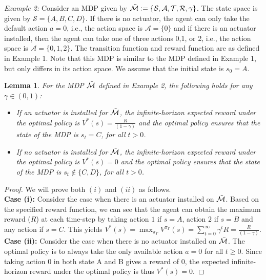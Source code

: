 \documentclass[twocolumn]{autart}    %
\newtheorem{lemma}{Lemma}
\begin{document}
\textit{Example 2:} Consider an MDP given by $\Tilde{\mathcal{M}}:= \{\mathcal{S},\mathcal{A},  \mathcal{T}, \mathcal{R}, \gamma \}$. The state space is given by $\mathcal{S} = \{ A, B, C, D\}$. If there is no actuator, the agent can only take the default action $a = 0$, i.e., the action space is $\mathcal{A} = \{ 0\}$ and if there is an actuator installed, then the agent can take one of three actions 0,1, or 2,  i.e., the action space is $\mathcal{A} = \{ 0,1,2\}$. The transition function and reward function are as defined in Example 1. Note that this MDP is similar to the MDP defined in Example 1, but only differs in its action space. We assume that the initial state is $s_0 = A$.\\

\begin{lemma}
 \label{lma2}
For the MDP $\Tilde{\mathcal{M}}$ defined in Example 2, the following holds for any $\gamma\in (0,1)$:
\begin{itemize}
    \item [(i)] If an actuator is installed for $\Tilde{\mathcal{M}}$, the infinite-horizon expected reward under the optimal policy is $V^*(s) = \frac{R}{(1-\gamma)}$ and the optimal policy ensures that the state of the MDP is $s_t=C$, for all $t>0$. 
    \item[(ii)] If no actuator is installed for $\Tilde{\mathcal{M}}$, the infinite-horizon expected reward under the optimal policy is $V^*(s) = 0$ and the optimal policy ensures that the state of the MDP is $s_t\notin \{C,D \}$, for all $t>0$. 
\end{itemize}
\end{lemma} 
\begin{proof}
 We will prove both $(i)$ and $(ii)$ as follows. \\
\textbf{Case (i): } Consider the case when there is an actuator installed on $\Tilde{\mathcal{M}}$. Based on the specified reward function, we can see that the agent can obtain the maximum reward ($R$) at each time-step by taking action $1$ if $s=A$, action $2$ if $s=B$ and any action if $s = C$. This yields $ V^*(s) = \max_{\pi_\Gamma} V^{\pi_\Gamma}(s) = \sum_{t = 0}^{\infty} \gamma^t R = \frac{ R}{(1-\gamma)}$.  \\
\textbf{Case (ii): } Consider the case when there is no actuator installed on $\Bar{\mathcal{M}}$.
 The optimal policy is to always take the only available action $a = 0$ for all $t\geq 0$. Since taking action $0$ in both state A and B gives a reward of $0$, the expected infinite-horizon reward under the optimal policy is thus $V^*(s) = 0$.
\end{proof}
\end{document}
